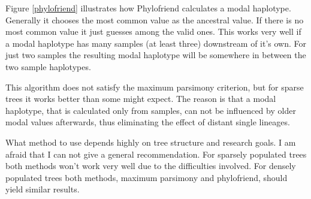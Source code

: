 Figure \ref{phylofriend} illustrates how Phylofriend calculates
a modal haplotype. Generally it chooses the most common value
as the ancestral value. If there is no most common value it
just guesses among the valid ones. This works very well if
a modal haplotype has many samples (at least three) downstream
of it's own. For just two samples the resulting modal haplotype
will be somewhere in between the two sample haplotypes.

This algorithm does not satisfy the maximum parsimony criterion,
but for sparse trees it works better than some might expect.
The reason is that a modal haplotype, that is calculated only
from samples, can not be influenced by older modal values afterwards,
thus eliminating the effect of distant single lineages.

What method to use depends highly on tree structure and
research goals. I am afraid that I can not give a general
recommendation. For sparsely populated trees both methods won't
work very well due to the difficulties involved.
For densely populated trees both methods, maximum parsimony
and phylofriend, should yield similar results.





